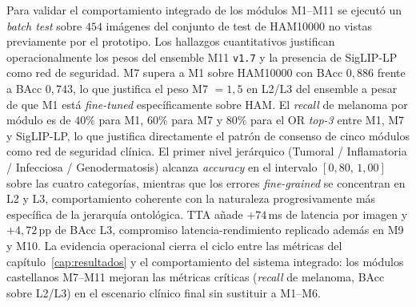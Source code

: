 Para validar el comportamiento integrado de los módulos M1--M11
se ejecutó un \emph{batch test} sobre $454$ imágenes del
conjunto de test de HAM10000 no vistas previamente por el
prototipo. Los hallazgos cuantitativos justifican operacionalmente
los pesos del ensemble M11 \texttt{v1.7} y la presencia de
SigLIP-LP como red de seguridad. M7 supera a M1 sobre HAM10000
con BAcc $0{,}886$ frente a BAcc $0{,}743$, lo que justifica el
peso M7 $= 1{,}5$ en L2/L3 del ensemble a pesar de que M1 está
\emph{fine-tuned} específicamente sobre HAM. El \emph{recall} de
melanoma por módulo es de $40\%$ para M1, $60\%$ para M7 y
$80\%$ para el OR \emph{top-3} entre M1, M7 y SigLIP-LP, lo que
justifica directamente el patrón de consenso de cinco módulos
como red de seguridad clínica. El primer nivel jerárquico
(Tumoral / Inflamatoria / Infecciosa / Genodermatosis) alcanza
\emph{accuracy} en el intervalo $[0{,}80,\,1{,}00]$ sobre las
cuatro categorías, mientras que los errores \emph{fine-grained}
se concentran en L2 y L3, comportamiento coherente con la
naturaleza progresivamente más específica de la jerarquía
ontológica. TTA añade $+74$\,ms de latencia por imagen y
$+4{,}72$\,pp de BAcc L3, compromiso latencia-rendimiento
replicado además en M9 y M10. La evidencia operacional cierra
el ciclo entre las métricas del capítulo~\ref{cap:resultados} y
el comportamiento del sistema integrado: los módulos castellanos
M7--M11 mejoran las métricas críticas (\emph{recall} de melanoma,
BAcc sobre L2/L3) en el escenario clínico final sin sustituir
a M1--M6.
